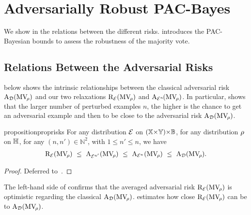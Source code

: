\section{Adversarially Robust PAC-Bayes}

We show in  the relations between the different risks.
 introduces the PAC-Bayesian bounds to assess the robustness of the majority vote.

\subsection{Relations Between the Adversarial Risks} 
\label{chap:mv-robustness:sec:relation}
 below shows the intrinsic relationships between the classical adversarial risk $\text{A}_{\mathcal{D}}(\text{MV}_{\!\rho})$ and our two relaxations $\text{R}_{{\mathcal{E}}}(\text{MV}_{\!\rho})$ and $\text{A}_{{\mathcal{E}}^{n\!}}(\text{MV}_{\!\rho})$.
In particular,  shows that the larger number of perturbed examples $n$, the higher is the chance to get an adversarial example and then to be close to the adversarial risk $\text{A}_{\mathcal{D}}(\text{MV}_{\!\rho})$.

\begin{restatable}{proposition}{proprisks}\label{chap:mv-robustness:proposition:risks} 
For any distribution ${\mathcal{E}}$ on $(\mathbb{X}{\times}\mathbb{Y}){\times}\mathbb{B}$, for any distribution $\rho$ on $\mathbb{H}$, for any \mbox{$(n, n')\in\mathbb{N}^2$}, with \mbox{$1 \le {n'} \le {n}$}, we have
\begin{align}
    \Risk_{\Dpert}(\MVQ)\ \le\ \RiskM_{\Dpert^{{n'}}}(\MVQ)\ \le\ \RiskM_{\Dpert^{{n}}}(\MVQ)\ \le\  \RiskA_{\D}(\MVQ).\label{chap:mv-robustness:eq:risks_inequalities}
\end{align}
\end{restatable}
\begin{noaddcontents}\begin{proof}
Deferred to~.
\end{proof}\end{noaddcontents}

The left-hand side of  confirms that the averaged adversarial risk $\text{R}_{{\mathcal{E}}}(\text{MV}_{\!\rho})$ is optimistic regarding the classical  $\text{A}_{\mathcal{D}}(\text{MV}_{\!\rho})$.
 estimates how close  $\text{R}_{{\mathcal{E}}}(\text{MV}_{\!\rho})$ can be to $\text{A}_{\mathcal{D}}(\text{MV}_{\!\rho})$.

